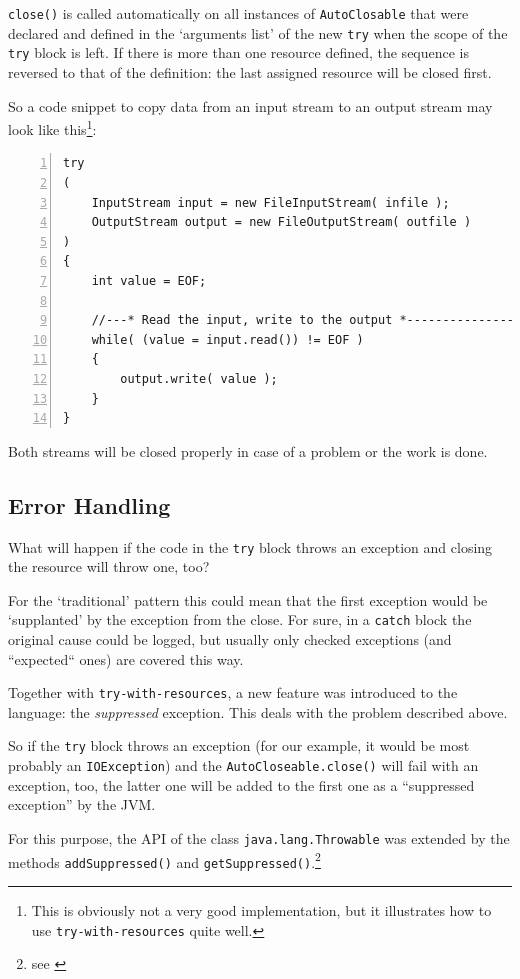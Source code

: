 \documentclass[11pt,a4paper, titlepage, parskip=half, headsepline, footsepline, cleardoublepage=current, headheight=1cm]{scrbook}
\begin{document}
\lstinline|close()| is called automatically on all instances of \lstinline|AutoClosable| that were declared and defined in the ‘arguments list’ of the new \lstinline|try| when the scope of the \lstinline|try| block is left. If there is more than one resource defined, the sequence is reversed to that of the definition: the last assigned resource will be closed first.

So a code snippet to copy data from an input stream to an output stream may look like this\footnote{This is obviously not a very good implementation, but it illustrates how to use \lstinline|try-with-resources| quite well.}:
\begin{lstlisting}[numbers=left]
try
( 
    InputStream input = new FileInputStream( infile );
    OutputStream output = new FileOutputStream( outfile ) 
)
{
	int value = EOF;
	
    //---* Read the input, write to the output *---------------------
    while( (value = input.read()) != EOF )
    {
        output.write( value );
    }
}
\end{lstlisting}
Both streams will be closed properly in case of a problem or the work is done.

\subsection{Error Handling}
What will happen if the code in the \lstinline|try| block throws an exception and closing the resource will throw one, too?

For the ‘traditional’ pattern this could mean that the first exception would be ‘supplanted’ by the exception from the close. For sure, in a \lstinline|catch| block the original cause could be logged, but usually only checked exceptions (and “expected“ ones) are covered this way.

Together with \lstinline|try-with-resources|, a new feature was introduced to the language: the \textit{suppressed} exception. This deals with the problem described above.

So if the \lstinline|try| block throws an exception (for our example, it would be most probably an \lstinline|IOException|) and the \lstinline|AutoCloseable.close()| will fail with an exception, too, the latter one will be added to the first one as a “suppressed exception” by the JVM.

For this purpose, the API of the class \lstinline|java.lang.Throwable| was extended by the methods \lstinline|addSuppressed()| and \lstinline|getSuppressed()|.\footnote{see \autocite{ORACLE_DOC_THROWABLE_CLASS}}
\end{document}
